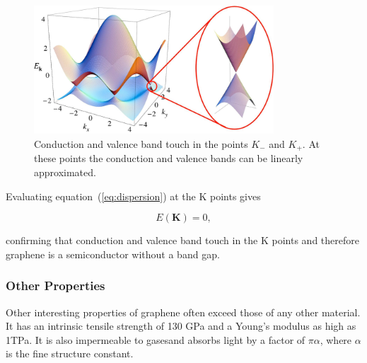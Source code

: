 \begin{figure}[!h]
  \centering
  \includegraphics[width=0.8\textwidth]{./images/dispersion.png}
  \caption { Conduction and valence band touch in the points $K_-$ and $K_+$. At these points the conduction and valence bands can be linearly approximated.\mcite }
  \label{fig:bands}
\end{figure}

Evaluating equation~(\ref{eq:dispersion}) at the K points gives

\begin{equation}
  E(\mathbf{K})=0,
\end{equation}

confirming that conduction and valence band touch in the K points and therefore graphene is a semiconductor without a band gap.

\subsubsection{Other Properties}

Other interesting properties of graphene often exceed those of any other material. It has an intrinsic tensile strength of 130 GPa and a Young's modulus as high as 1TPa\mcite. It is also impermeable to gases\mcite and absorbs light by a factor of $\pi\alpha$\mcite, where $\alpha$ is the fine structure constant.
